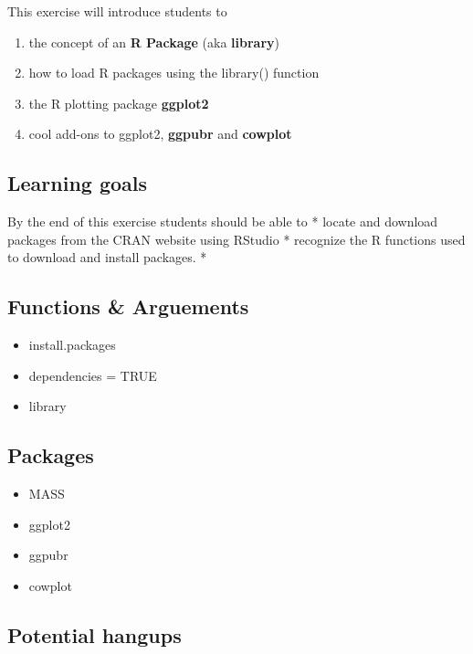 \documentclass[]{book}
\providecommand{\tightlist}{%
  \setlength{\itemsep}{0pt}\setlength{\parskip}{0pt}}
\theoremstyle{definition}
\theoremstyle{definition}
\theoremstyle{definition}
\theoremstyle{remark}
\begin{document}
This exercise will introduce students to

\begin{enumerate}
\def\labelenumi{\arabic{enumi}.}
\tightlist
\item
  the concept of an \textbf{R Package} (aka \textbf{library})
\item
  how to load R packages using the library() function
\item
  the R plotting package \textbf{ggplot2}
\item
  cool add-ons to ggplot2, \textbf{ggpubr} and \textbf{cowplot}
\end{enumerate}

\subsection{Learning goals}\label{learning-goals}

By the end of this exercise students should be able to * locate and
download packages from the CRAN website using RStudio * recognize the R
functions used to download and install packages. *

\subsection{Functions \& Arguements}\label{functions-arguements}

\begin{itemize}
\tightlist
\item
  install.packages
\item
  dependencies = TRUE
\item
  library
\end{itemize}

\subsection{Packages}\label{packages}

\begin{itemize}
\tightlist
\item
  MASS
\item
  ggplot2
\item
  ggpubr
\item
  cowplot
\end{itemize}

\subsection{Potential hangups}\label{potential-hangups}
\end{document}
